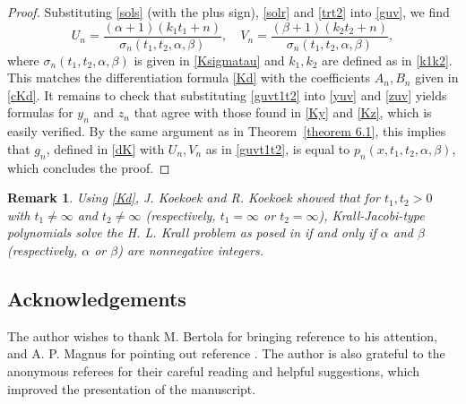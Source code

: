 \documentclass[10pt, reqno]{amsart}
\numberwithin{equation}{section}
\newtheorem{remark}{Remark}[section]
\numberwithin{equation}{section}
\begin{document}
\begin{proof}
Substituting \eqref{sols} (with the plus sign), \eqref{solr} and \eqref{trt2} into \eqref{guv}, we find
\begin{equation}
U_n=\frac{(\alpha+1)(k_1t_1+n)}{\sigma_n(t_1,t_2,\alpha,\beta)},\quad
V_n=\frac{(\beta+1)(k_2t_2+n)}{\sigma_n(t_1,t_2,\alpha,\beta)}, \label{guvt1t2}
\end{equation}
where $\sigma_n(t_1,t_2,\alpha,\beta)$ is given in \eqref{Ksigmatau} and $k_1,k_2$ are defined as in \eqref{k1k2}. This matches the differentiation formula \eqref{Kd} with the coefficients $A_n,B_n$ given in \eqref{cKd}. It remains to check that substituting \eqref{guvt1t2} into \eqref{yuv} and \eqref{zuv} yields formulas for $y_n$ and $z_n$ that agree with those found in \eqref{Ky} and \eqref{Kz}, which is easily verified. By the same argument as in Theorem~\ref{theorem 6.1}, this implies that $g_n$, defined in \eqref{dK} with $U_n,V_n$ as in \eqref{guvt1t2}, is equal to $p_n(x,t_1,t_2,\alpha,\beta)$, which concludes the proof.
\end{proof}
\begin{remark}\label{remark 6.2}
\emph{Using \eqref{Kd}, J. Koekoek and R. Koekoek \cite{KK2} showed that for $t_1, t_2>0$ with $t_1\neq \infty$ and $t_2\neq \infty$ (respectively, $t_1=\infty$ or $t_2=\infty$), Krall-Jacobi-type polynomials solve the H. L. Krall problem as posed in \cite{K1} if and only if  $\alpha$ and  $\beta$ (respectively, $\alpha$ or $\beta$) are nonnegative integers.}
\end{remark}


\subsection*{Acknowledgements} 
The author wishes to thank M. Bertola for bringing reference \cite{BEH} to his attention, and A. P. Magnus for pointing out reference \cite{Re}. The author is also grateful to the anonymous referees for their careful reading and helpful suggestions, which improved the presentation of the manuscript.


%
%
\end{document}
